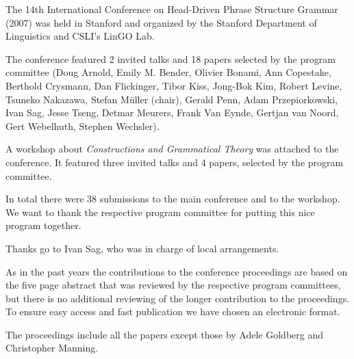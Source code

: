 The 14th International Conference on Head-Driven Phrase Structure Grammar (2007) was held in Stanford
and organized by the Stanford Department of Linguistics and CSLI's LinGO Lab.

The conference featured 2 invited talks and 18 papers
selected by the program committee 
(Doug Arnold,      
Emily M. Bender,	
Olivier Bonami,	
Ann Copestake,	
Berthold Crysmann,
Dan Flickinger,	
Tibor Kiss,	
Jong-Bok Kim,	
Robert Levine,	
Tsuneko Nakazawa,
Stefan Müller (chair),
Gerald Penn,	
Adam Przepiorkowski,
Ivan Sag,	
Jesse Tseng,	
Detmar Meurers,	  
Frank Van Eynde,
Gertjan van Noord,
Gert Webelhuth,	
Stephen Wechsler).

A workshop about \emph{Constructions and Grammatical Theory}
was attached to the conference. It featured three invited talks
and 4 papers, selected by the program committee.

In total there were 38 submissions to the main conference and to the
workshop. 
We want to thank the respective program committee for putting this nice program together.



Thanks go to Ivan Sag, who was in charge of local arrangements.


As in the past years the contributions to the conference proceedings are based on the five page abstract
that was reviewed by the respective program committees, but there is no additional reviewing of the
longer contribution to the proceedings.
To ensure easy access and fast publication we have chosen an electronic format.


The proceedings include all the papers except those by Adele Goldberg and Christopher Manning.
